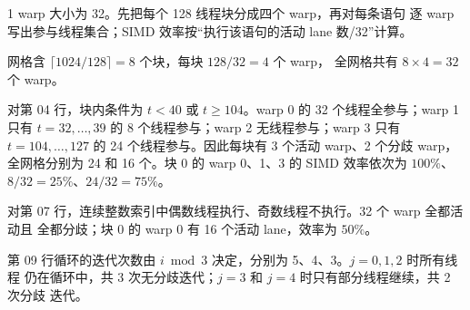 \begin{solutionexercise}{1}
\approachheading warp 大小为 32。先把每个 128 线程块分成四个 warp，再对每条语句
逐 warp 写出参与线程集合；SIMD 效率按“执行该语句的活动 lane 数/32”计算。

\answerheading 网格含 $\lceil1024/128\rceil=8$ 个块，每块 $128/32=4$ 个 warp，
全网格共有 $8\times4=32$ 个 warp。

对第 04 行，块内条件为 $t<40$ 或 $t\ge104$。warp 0 的 32 个线程全参与；warp 1
只有 $t=32,\ldots,39$ 的 8 个线程参与；warp 2 无线程参与；warp 3 只有
$t=104,\ldots,127$ 的 24 个线程参与。因此每块有 3 个活动 warp、2 个分歧 warp，
全网格分别为 24 和 16 个。块 0 的 warp 0、1、3 的 SIMD 效率依次为
$100\%$、$8/32=25\%$、$24/32=75\%$。

对第 07 行，连续整数索引中偶数线程执行、奇数线程不执行。32 个 warp 全都活动且
全都分歧；块 0 的 warp 0 有 16 个活动 lane，效率为 $50\%$。

第 09 行循环的迭代次数由 $i\bmod3$ 决定，分别为 5、4、3。$j=0,1,2$ 时所有线程
仍在循环中，共 3 次无分歧迭代；$j=3$ 和 $j=4$ 时只有部分线程继续，共 2 次分歧
迭代。


\end{solutionexercise}

